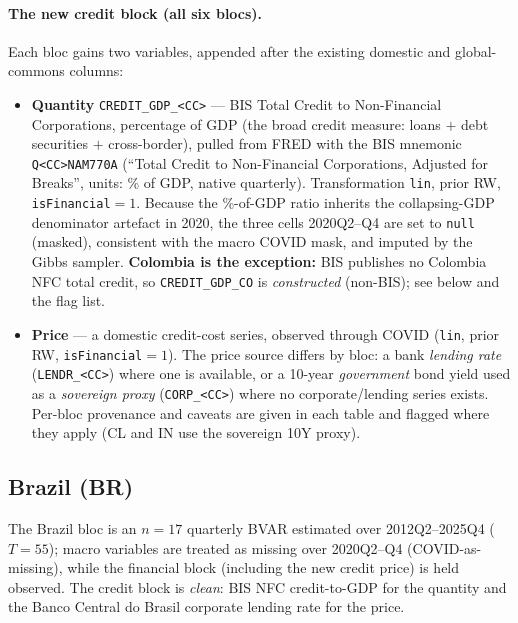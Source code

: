 \paragraph{The new credit block (all six blocs).} Each bloc gains two
variables, appended after the existing domestic and global-commons columns:
\begin{itemize}\setlength\itemsep{1pt}
  \item \textbf{Quantity} \texttt{CREDIT\_GDP\_<CC>} --- BIS Total Credit to
    Non-Financial Corporations, percentage of GDP (the broad credit measure:
    loans $+$ debt securities $+$ cross-border), pulled from FRED with the BIS
    mnemonic \texttt{Q<CC>NAM770A} (``Total Credit to Non-Financial
    Corporations, Adjusted for Breaks'', units: \% of GDP, native quarterly).
    Transformation \texttt{lin}, prior RW, \texttt{isFinancial}$=1$. Because
    the \%-of-GDP ratio inherits the collapsing-GDP denominator artefact in
    2020, the three cells 2020Q2--Q4 are set to \texttt{null} (masked),
    consistent with the macro COVID mask, and imputed by the Gibbs sampler.
    \textbf{Colombia is the exception:} BIS publishes no Colombia NFC total
    credit, so \texttt{CREDIT\_GDP\_CO} is \emph{constructed} (non-BIS); see
    below and the flag list.
  \item \textbf{Price} --- a domestic credit-cost series, observed through
    COVID (\texttt{lin}, prior RW, \texttt{isFinancial}$=1$). The price source
    differs by bloc: a bank \emph{lending rate} (\texttt{LENDR\_<CC>}) where
    one is available, or a 10-year \emph{government} bond yield used as a
    \emph{sovereign proxy} (\texttt{CORP\_<CC>}) where no corporate/lending
    series exists. Per-bloc provenance and caveats are given in each table and
    flagged where they apply (CL and IN use the sovereign 10Y proxy).
\end{itemize}

\subsection{Brazil (BR)}\label{sec:data:BR}

The Brazil bloc is an $n=17$ quarterly BVAR estimated over 2012Q2--2025Q4
($T=55$); macro variables are treated as missing over 2020Q2--Q4 (COVID-as-missing),
while the financial block (including the new credit price) is held observed.
The credit block is \emph{clean}: BIS NFC credit-to-GDP for the quantity and the
Banco Central do Brasil corporate lending rate for the price.


